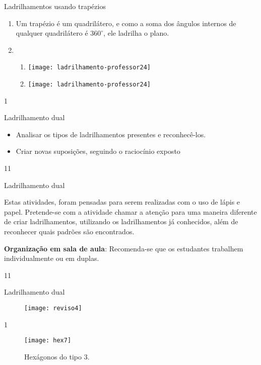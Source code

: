 \begin{answer}{Ladrilhamentos usando trapézios}
{
	\begin{enumerate}
	\item Um trapézio é um quadrilátero, e como a soma dos ângulos internos de qualquer quadrilátero é $360^{\circ}$, ele ladrilha o plano.
	\item
	\begin{enumerate}
	\item 
	{
	\texttt{[image: ladrilhamento-professor24]}
	}

	\item
	{	
	\texttt{[image: ladrilhamento-professor24]}
	}
	\end{enumerate}
	\end{enumerate}
}{1}
\end{answer}

\clearmargin
\begin{objectives}{Ladrilhamento dual}
{
	\begin{itemize}
	\item Analisar os tipos de ladrilhamentos presentes e reconhecê-los.
	\item Criar novas suposições, seguindo o raciocínio exposto
	\end{itemize}
}{1}{1}
\end{objectives}
\begin{sugestions}{Ladrilhamento dual}
{
	Estas atividades, foram pensadas para serem realizadas com o uso de lápis e papel. Pretende-se com a atividade chamar a atenção para uma maneira diferente de criar  ladrilhamentos, utilizando os ladrilhamentos já conhecidos, além de  reconhecer quais padrões são encontrados. 

	\textbf{Organização em sala de aula}: Recomenda-se que os estudantes trabalhem individualmente ou em duplas.
}{1}{1}
\end{sugestions}
\begin{answer}{Ladrilhamento dual}
{
	\begin{figure}[H]
	\centering
	
	\texttt{[image: reviso4]}
	\end{figure}
}{1}
\end{answer}

\begin{figure}[H]
\centering
\texttt{[image: hex7]}
\caption{Hexágonos do tipo 3.}
\label{hex7}
\end{figure}

